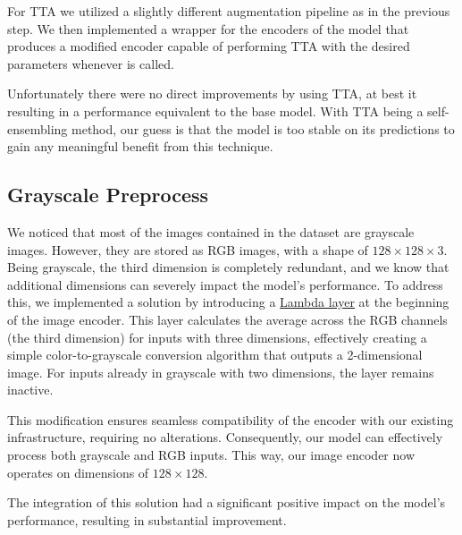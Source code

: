 \documentclass[10pt,twocolumn,letterpaper]{article}
\begin{document}
For TTA we utilized a slightly different augmentation pipeline as in the previous step.
We then implemented a wrapper for the encoders of the model that produces a modified encoder capable of performing TTA with the desired parameters whenever is called.

Unfortunately there were no direct improvements by using TTA, at best it resulting in a performance equivalent to the base model.
With TTA being a self-ensembling method, our guess is that the model is too stable on its predictions to gain any meaningful benefit from this technique.

\subsection{Grayscale Preprocess}
We noticed that most of the images contained in the dataset are grayscale images. However, they are stored as RGB images, with a shape of $ 128 \times 128 \times 3 $. Being grayscale, the third dimension is completely redundant, and we know that additional dimensions can severely impact the model's performance. To address this, we implemented a solution by introducing a \href{https://www.tensorflow.org/api_docs/python/tf/keras/layers/Lambda}{Lambda layer} at the beginning of the image encoder. This layer calculates the average across the RGB channels (the third dimension) for inputs with three dimensions, effectively creating a simple color-to-grayscale conversion algorithm that outputs a 2-dimensional image. For inputs already in grayscale with two dimensions, the layer remains inactive.

This modification ensures seamless compatibility of the encoder with our existing infrastructure, requiring no alterations. Consequently, our model can effectively process both grayscale and RGB inputs. This way, our image encoder now operates on dimensions of $128 \times 128$.

The integration of this solution had a significant positive impact on the model's performance, resulting in substantial improvement.
\end{document}
